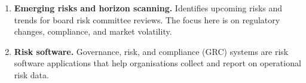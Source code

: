 \begin{enumerate}
\item[\textcolor{rust}{\sffamily\bfseries 7)}] \textbf{Emerging risks and horizon
scanning.} Identifies upcoming risks and trends for board risk committee reviews.
The focus here is on regulatory changes, compliance, and market volatility.
\item[\textcolor{rust}{\sffamily\bfseries 8)}] \textbf{Risk software.} Governance,
risk, and compliance (GRC) systems are risk software applications that help
organisations collect and report on operational risk data.
\end{enumerate}



